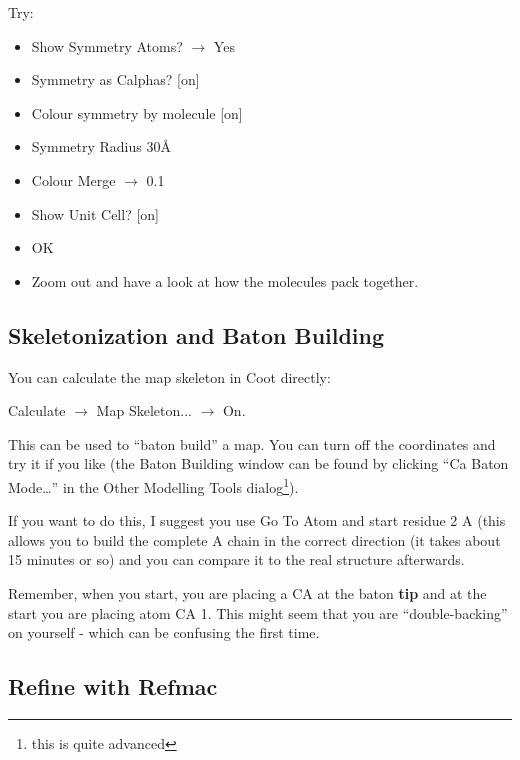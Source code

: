\documentclass{article}
\begin{document}
Try:
\begin{itemize}
\item \textsf{Show Symmetry Atoms? $\rightarrow$ Yes}
\item \textsf{Symmetry as Calphas?} [on]
\item \textsf{Colour symmetry by molecule} [on]
\item \textsf{Symmetry Radius 30\AA}
\item \textsf{Colour Merge $\rightarrow$ 0.1}
\item \textsf{Show Unit Cell?} [on]
\item \textsf{OK}
\item Zoom out and have a look at how the molecules pack together.
\end{itemize}


\subsection{Skeletonization and Baton Building}

You can calculate the map skeleton in Coot directly:

\textsf{Calculate $\rightarrow$ Map Skeleton... $\rightarrow$ On.}

This can be used to ``baton build'' a map.  You can turn off the
coordinates and try it if you like (the Baton Building window can be
found by clicking \textsf{``Ca Baton Mode\ldots''} in the Other
Modelling Tools dialog\footnote{this is quite advanced}).
  
If you want to do this, I suggest you use Go To Atom and start residue
2 A (this allows you to build the complete A chain in the correct
direction (it takes about 15 minutes or so) and you can compare it to
the real structure afterwards.
  
  Remember, when you start, you are placing a CA at the baton
  \textbf{tip} and at the start you are placing atom CA 1.  This might
  seem that you are ``double-backing'' on yourself - which can be
  confusing the first time.

\subsection{Refine with Refmac}
\end{document}
